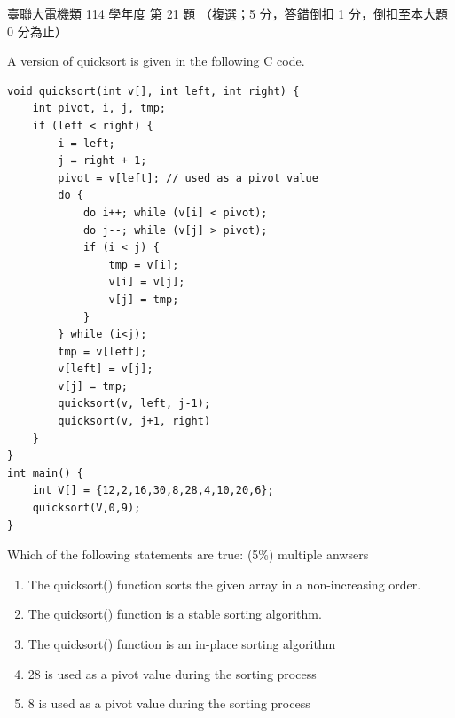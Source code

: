 \begin{pastexam}[label={px:ust-114-ee-ds-21}]{臺聯大電機類 114 學年度 第 21 題}
（複選；5 分，答錯倒扣 1 分，倒扣至本大題 0 分為止）

A version of quicksort is given in the following C code.
\begin{verbatim}
void quicksort(int v[], int left, int right) {
    int pivot, i, j, tmp;
    if (left < right) {
        i = left;
        j = right + 1;
        pivot = v[left]; // used as a pivot value
        do {
            do i++; while (v[i] < pivot);
            do j--; while (v[j] > pivot);
            if (i < j) {
                tmp = v[i];
                v[i] = v[j];
                v[j] = tmp;
            }
        } while (i<j);
        tmp = v[left];
        v[left] = v[j];
        v[j] = tmp;
        quicksort(v, left, j-1);
        quicksort(v, j+1, right)
    }
}
int main() {
    int V[] = {12,2,16,30,8,28,4,10,20,6};
    quicksort(V,0,9);
}
\end{verbatim}
Which of the following statements are true: (5\%) multiple anwsers
\begin{enumerate}[label=(\Alph*)]
\item The quicksort() function sorts the given array in a non-increasing order.
\item The quicksort() function is a stable sorting algorithm.
\item The quicksort() function is an in-place sorting algorithm
\item 28 is used as a pivot value during the sorting process
\item 8 is used as a pivot value during the sorting process
\end{enumerate}
\end{pastexam}

